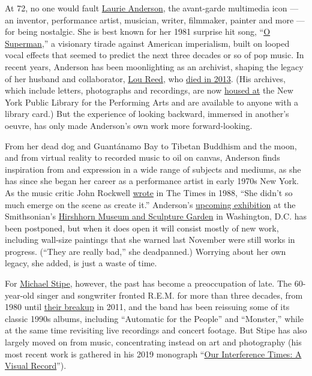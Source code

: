 At 72, no one would fault
\href{https://www.nytimes3xbfgragh.onion/topic/person/laurie-anderson}{Laurie
Anderson}, the avant-garde multimedia icon --- an inventor, performance
artist, musician, writer, filmmaker, painter and more --- for being
nostalgic. She is best known for her 1981 surprise hit song,
``\href{https://www.youtube.com/watch?v=Vkfpi2H8tOE}{O Superman},'' a
visionary tirade against American imperialism, built on looped vocal
effects that seemed to predict the next three decades or so of pop
music. In recent years, Anderson has been moonlighting as an archivist,
shaping the legacy of her husband and collaborator,
\href{https://www.nytimes3xbfgragh.onion/topic/person/lou-reed}{Lou
Reed}, who
\href{https://www.nytimes3xbfgragh.onion/2013/10/28/arts/music/lou-reed-dies-at-71.html}{died
in 2013}. (His archives, which include letters, photographs and
recordings, are now \href{https://www.nypl.org/loureed}{housed at} the
New York Public Library for the Performing Arts and are available to
anyone with a library card.) But the experience of looking backward,
immersed in another's oeuvre, has only made Anderson's own work more
forward-looking.

From her dead dog and Guantánamo Bay to Tibetan Buddhism and the moon,
and from virtual reality to recorded music to oil on canvas, Anderson
finds inspiration from and expression in a wide range of subjects and
mediums, as she has since she began her career as a performance artist
in early 1970s New York. As the music critic John Rockwell
\href{https://www.nytimes3xbfgragh.onion/1988/07/23/arts/review-pop-laurie-anderson-returns.html}{wrote}
in The Times in 1988, ``She didn't so much emerge on the scene as create
it.'' Anderson's
\href{https://hirshhorn.si.edu/exhibitions/laurie-anderson-the-weather/}{upcoming
exhibition} at the Smithsonian's
\href{https://www.nytimes3xbfgragh.onion/2016/11/05/arts/design/hirshhorn-museum-and-sculpture-garden-goes-international.html}{Hirshhorn
Museum and Sculpture Garden} in Washington, D.C. has been postponed, but
when it does open it will consist mostly of new work, including
wall-size paintings that she warned last November were still works in
progress. (``They are really bad,'' she deadpanned.) Worrying about her
own legacy, she added, is just a waste of time.

For
\href{https://www.nytimes3xbfgragh.onion/2015/08/14/t-magazine/my-10-favorite-books-michael-stipe.html}{Michael
Stipe}, however, the past has become a preoccupation of late. The
60-year-old singer and songwriter fronted R.E.M. for more than three
decades, from 1980 until
\href{https://www.nytimes3xbfgragh.onion/2011/09/22/arts/music/rem-breaks-up-after-31-years-as-a-band.html}{their
breakup} in 2011, and the band has been reissuing some of its classic
1990s albums, including ``Automatic for the People'' and ``Monster,''
while at the same time revisiting live recordings and concert footage.
But Stipe has also largely moved on from music, concentrating instead on
art and photography (his most recent work is gathered in his 2019
monograph ``\href{https://www.damianieditore.com/en-US/product/735}{Our
Interference Times: A Visual Record}'').

